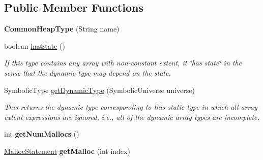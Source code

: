 \subsection*{Public Member Functions}
\begin{DoxyCompactItemize}
\item 
\hypertarget{classedu_1_1udel_1_1cis_1_1vsl_1_1civl_1_1model_1_1common_1_1type_1_1CommonHeapType_ac21c89238b275031d46dc8376c306d22}{}{\bfseries Common\+Heap\+Type} (String name)\label{classedu_1_1udel_1_1cis_1_1vsl_1_1civl_1_1model_1_1common_1_1type_1_1CommonHeapType_ac21c89238b275031d46dc8376c306d22}

\item 
boolean \hyperlink{classedu_1_1udel_1_1cis_1_1vsl_1_1civl_1_1model_1_1common_1_1type_1_1CommonHeapType_a71dda177dfaf67159a95716f079d85a7}{has\+State} ()
\begin{DoxyCompactList}\small\item\em If this type contains any array with non-\/constant extent, it \char`\"{}has state\char`\"{} in the sense that the dynamic type may depend on the state. \end{DoxyCompactList}\item 
Symbolic\+Type \hyperlink{classedu_1_1udel_1_1cis_1_1vsl_1_1civl_1_1model_1_1common_1_1type_1_1CommonHeapType_adff4ee2b344ba30f1e8a2c9ffeb6e0fe}{get\+Dynamic\+Type} (Symbolic\+Universe universe)
\begin{DoxyCompactList}\small\item\em This returns the dynamic type corresponding to this static type in which all array extent expressions are ignored, i.\+e., all of the dynamic array types are incomplete. \end{DoxyCompactList}\item 
\hypertarget{classedu_1_1udel_1_1cis_1_1vsl_1_1civl_1_1model_1_1common_1_1type_1_1CommonHeapType_a8e38e0ad2c99544e7e309c57b8fe866c}{}int {\bfseries get\+Num\+Mallocs} ()\label{classedu_1_1udel_1_1cis_1_1vsl_1_1civl_1_1model_1_1common_1_1type_1_1CommonHeapType_a8e38e0ad2c99544e7e309c57b8fe866c}

\item 
\hypertarget{classedu_1_1udel_1_1cis_1_1vsl_1_1civl_1_1model_1_1common_1_1type_1_1CommonHeapType_aa9c60c19e7263ca5ac8d96d6e72347ed}{}\hyperlink{interfaceedu_1_1udel_1_1cis_1_1vsl_1_1civl_1_1model_1_1IF_1_1statement_1_1MallocStatement}{Malloc\+Statement} {\bfseries get\+Malloc} (int index)\label{classedu_1_1udel_1_1cis_1_1vsl_1_1civl_1_1model_1_1common_1_1type_1_1CommonHeapType_aa9c60c19e7263ca5ac8d96d6e72347ed}


\end{DoxyCompactItemize}
